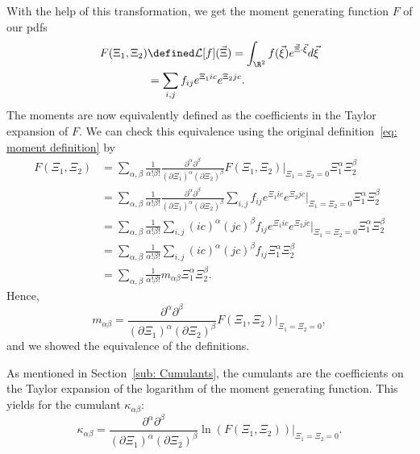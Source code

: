 With the help of this transformation, we get the moment generating function $F$ of our \glspl{pdf}
\begin{equation}
  \label{eq:Definition of F}
  \begin{aligned}
    F(\Xi_1, \Xi_2) & \defined \mathcal{L}[f](\vec{\Xi}) = \int_{\R^2} f(\vec{\xi}) e^{\vec{\Xi} \cdot \vec{\xi}}d\vec{\xi} \\
     & = \sum_{i,j}f_{ij} e^{\Xi_1 ic} e^{\Xi_2 jc}.
  \end{aligned}
\end{equation}
The moments are now equivalently defined as the coefficients in the Taylor expansion of $F$.
We can check this equivalence using the original definition~\eqref{eq: moment definition} by
\begin{equation}
  \label{eq: taylor of F}
  \begin{aligned}
    F(\Xi_1, \Xi_2) & = \sum_{\alpha,\beta} \frac{1}{\alpha!\beta!} \frac{\partial^\alpha\partial^\beta}{{(\partial \Xi_1)}^\alpha{(\partial \Xi_2)}^\beta} F(\Xi_1, \Xi_2)\Bigr|_{\Xi_1=\Xi_2 = 0} \Xi_1^\alpha \Xi_2^\beta \\
    & = \sum_{\alpha,\beta} \frac{1}{\alpha!\beta!} \frac{\partial^\alpha\partial^\beta}
      {{(\partial \Xi_1)}^\alpha{(\partial \Xi_2)}^\beta}  \sum_{i,j} f_{ij} e^{\Xi_1 ic} e^{\Xi_2 jc} \Bigr|_{\Xi_1=\Xi_2 = 0} \Xi_1^\alpha \Xi_2^\beta \\
    & = \sum_{\alpha,\beta} \frac{1}{\alpha!\beta!}
    \sum_{i,j}  {(ic)}^\alpha {(jc)}^\beta f_{ij} e^{\Xi_1 ic} e^{\Xi_2 jc} \Bigr|_{\Xi_1=\Xi_2 = 0} \Xi_1^\alpha \Xi_2^\beta \\
    & = \sum_{\alpha,\beta} \frac{1}{\alpha!\beta!}
    \sum_{i,j} {(ic)}^\alpha {(jc)}^\beta f_{ij} \Xi_1^\alpha \Xi_2^\beta \\
    & = \sum_{\alpha,\beta} \frac{1}{\alpha!\beta!} m_{\alpha\beta} \Xi_1^\alpha \Xi_2^\beta.
  \end{aligned}
\end{equation}
Hence,
\begin{equation}
  \label{eq: alternative representation of moments}
  m_{\alpha\beta} = \frac{\partial^\alpha\partial^\beta}{{(\partial \Xi_1)}^\alpha{(\partial \Xi_2)}^\beta} F(\Xi_1, \Xi_2)\Bigr|_{\Xi_1=\Xi_2 = 0},
\end{equation}
and we showed the equivalence of the definitions.

As mentioned in Section~\ref{sub: Cumulants}, the cumulants are the coefficients on the Taylor expansion of the logarithm of the moment generating function.
This yields for the cumulant $\kappa_{\alpha\beta}$:
\begin{equation}
  \label{eq: definition of cumulants}
  \kappa_{\alpha\beta} = \frac{\partial^\alpha\partial^\beta}{{(\partial \Xi_1)}^\alpha{(\partial \Xi_2)}^\beta} \ln(F(\Xi_1, \Xi_2))\Bigr|_{\Xi_1=\Xi_2 = 0}.
\end{equation}
